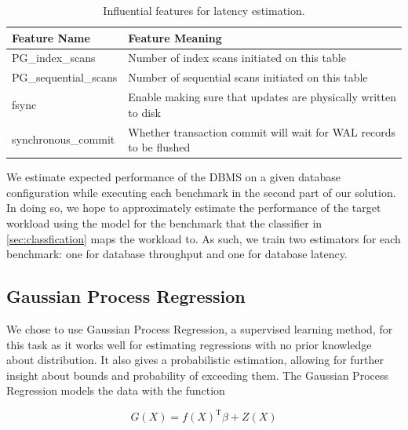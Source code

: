 \begin{table}[h!]
  \centering
  \begin{adjustbox}{max width=\linewidth}
    \begin{tabular}{ll}
      \toprule
      Feature Name          & Feature Meaning                                                    \\
      \midrule
      PG\_index\_scans      & Number of index scans initiated on this table                      \\
      PG\_sequential\_scans & Number of sequential scans initiated on this table                 \\
      fsync                 & Enable making sure that updates are physically written to disk     \\
      synchronous\_commit   & Whether transaction commit will wait for WAL records to be flushed \\
      \bottomrule
    \end{tabular}
  \end{adjustbox}

  \caption{Influential features for latency estimation.}
  \label{tab:influential_features_for_latency}
\end{table}

We estimate expected performance of the DBMS on a given database configuration
while executing each benchmark in the second part of our solution.
In doing so, we hope to approximately estimate the performance of the target
workload using the model for the benchmark that the classifier in
\cref{sec:classfication} maps the workload to.
As such, we train two estimators for each benchmark: one for database
throughput and one for database latency.

\subsection{Gaussian Process Regression}
\label{sec:gp}

We chose to use Gaussian Process Regression, a supervised learning
method, for this task as it works well for estimating regressions with
no prior knowledge about distribution. It also gives a probabilistic
estimation, allowing for further insight about bounds and probability
of exceeding them. The Gaussian Process Regression models the data
with the function

\begin{equation*}
G(X) = f(X)^{\textrm{T}}\beta + Z(X)
\end{equation*}

